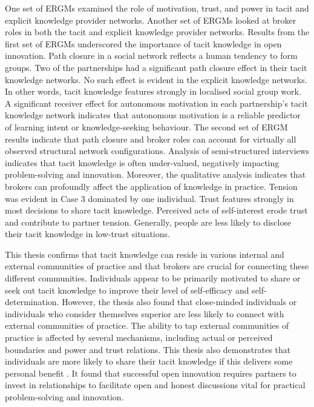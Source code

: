 One set of ERGMs examined the role of motivation, trust, and power in tacit and explicit knowledge provider networks. Another set of ERGMs looked at broker roles in both the tacit and explicit knowledge provider networks. Results from the first set of ERGMs underscored the importance of tacit knowledge in open innovation. Path closure in a social network reflects a human tendency to form groups. Two of the partnerships had a significant path closure effect in their tacit knowledge networks. No such effect is evident in the explicit knowledge networks. In other words, tacit knowledge features strongly in localised social group work. A significant receiver effect for autonomous motivation in each partnership's tacit knowledge network indicates that autonomous motivation is a reliable predictor of learning intent or knowledge-seeking behaviour. The second set of ERGM results indicate that path closure and broker roles can account for virtually all observed structural network configurations. Analysis of semi-structured interviews indicates that tacit knowledge is often under-valued, negatively impacting problem-solving and innovation. Moreover, the qualitative analysis indicates that brokers can profoundly affect the application of knowledge in practice. Tension was evident in Case 3 dominated by one individual. Trust features strongly in most decisions to share tacit knowledge. Perceived acts of self-interest erode trust and contribute to partner tension. Generally, people are less likely to disclose their tacit knowledge in low-trust situations. \medskip

This thesis confirms that tacit knowledge can reside in various internal and external communities of practice and that brokers are crucial for connecting these different communities. Individuals appear to be primarily motivated to share or seek out tacit knowledge to improve their level of self-efficacy and self-determination. However, the thesis also found that close-minded individuals or individuals who consider themselves superior are less likely to connect with external communities of practice. The ability to tap external communities of practice is affected by several mechanisms, including actual or perceived boundaries and power and trust relations. This thesis also demonstrates that individuals are more likely to share their tacit knowledge if this delivers some personal benefit \citep{liu2021more}. It found that successful open innovation requires partners to invest in relationships to facilitate open and honest discussions vital for practical problem-solving and innovation.


